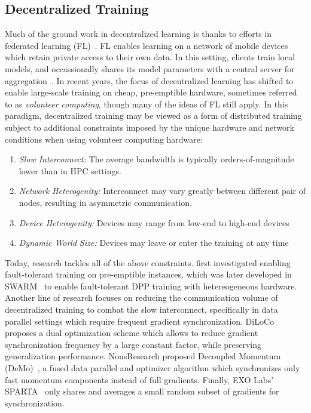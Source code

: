 \documentclass{article}
\begin{document}
\subsection{Decentralized Training}

Much of the ground work in decentralized learning is thanks to efforts in 
federated learning (FL)~\cite{mcmahan2016fl}. FL enables learning on a network
of mobile devices which retain private access to their own data. In this
setting, clients train local models, and occassionally shares its model
parameters with a central server for
aggregation~\cite{mcmahan2016fl,wang2020fedma}. In recent years, the focus of
decentralized learning has shifted to enable large-scale training on cheap,
pre-emptible hardware, sometimes referred to as \textit{volunteer computing},
though many of the ideas of FL still apply. In this paradigm, decentralized
training may be viewed as a form of distributed training subject to additional
constraints imposed by the unique hardware and network conditions when using
volunteer computing hardware:

\begin{enumerate}
  \item \textit{Slow Interconnect:} The average bandwidth is typically
  orders-of-magnitude lower than in HPC settings.
  \item \textit{Network Heterogenity:} Interconnect may vary greatly between
  different pair of nodes, resulting in asymmetric communication.
  \item \textit{Device Heterogenity:} Devices may range from low-end to high-end devices
  \item \textit{Dynamic World Size:} Devices may leave or enter the training at any time
\end{enumerate}

Today, research tackles all of the above constraints.
\citeauthor{zhang2020volatileinstances} first investigated enabling
fault-tolerant training on pre-emptible instances, which was later developed in 
SWARM~\cite{ryabinin2023swarm} to enable fault-tolerant DPP training with 
hetereogeneous hardware. Another line of research focuses on reducing the
communication volume of decentralized training to combat the slow interconnect,
specifically in data parallel settings which require frequent gradient
synchronization. DiLoCo~\cite{douillard2023diloco} proposes a dual optimization
scheme which allows to reduce gradient synchronization frequency by a large
constant factor, while preserving generalization performance. NousResearch
proposed Decoupled Momentum (DeMo)~\cite{peng2024demo}, a fused data parallel
and optimizer algorithm which synchronizes only fast momentum components instead
of full gradients. Finally, EXO Labs' SPARTA~\cite{exo2025sparta} only shares
and averages a small random subset of gradients for synchronization.
\end{document}
